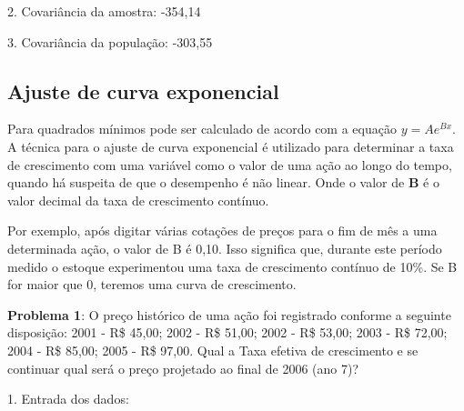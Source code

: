 2. Covariância da amostra: -354,14 \\
  \keystroke{$\times$}     \keystroke{$\times$}

3. Covariância da população: -303,55 \\
   \keystroke{$-$}   \keystroke{$\div$} \keystroke{$\times$}

\subsection*{Ajuste de curva exponencial}
Para quadrados mínimos pode ser calculado de acordo com a equação $y = Ae^{Bx}$. A técnica para o ajuste de curva exponencial é utilizado para determinar a taxa de crescimento com uma variável como o valor de uma ação ao longo do tempo, quando há suspeita de que o desempenho é não linear. Onde o valor de \textbf{B} é o valor decimal da taxa de crescimento contínuo. 

Por exemplo, após digitar várias cotações de preços para o fim de mês a uma determinada ação, o valor de B é 0,10. Isso significa que, durante este período medido o estoque experimentou uma taxa de crescimento contínuo de 10\%. Se B for maior que 0, teremos uma curva de crescimento.

\textbf{Problema 1}: O preço histórico de uma ação foi registrado conforme a seguinte disposição: 2001 - R\$ 45,00; 2002 - R\$ 51,00; 2002 - R\$ 53,00; 2003 - R\$ 72,00; 2004 - R\$ 85,00; 2005 - R\$ 97,00. Qual a Taxa efetiva de crescimento e se continuar qual será o preço projetado ao final de 2006 (ano 7)?

1. Entrada dos dados: \\
  \\
     \keystroke{$\sum+$} \\
     \keystroke{$\sum+$} \\
     \keystroke{$\sum+$} \\
     \keystroke{$\sum+$} \\
     \keystroke{$\sum+$} \\
     \keystroke{$\sum+$}

